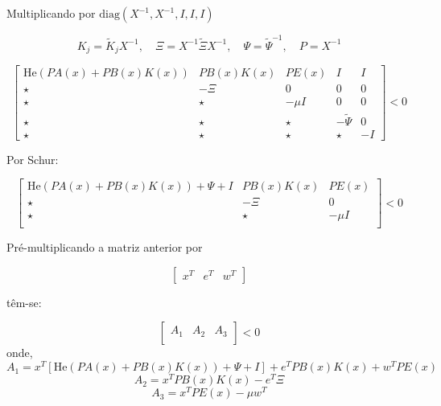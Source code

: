 Multiplicando por $\text{diag}(X^{-1}, X^{-1}, I, I, I)$

\begin{equation}
  K_j = \tilde K_j X^{-1}, \quad \Xi = X^{-1} \tilde \Xi X^{-1}, \quad \Psi = \tilde \Psi^{-1}, \quad P = X^{-1}
\end{equation}

\begin{equation}
  \begin{bmatrix}
    \text{He}(PA(x) + PB(x)K(x)) & PB(x)K(x) & P E(x) & I             & I   \\
    \star                        & -\Xi      & 0      & 0             & 0   \\
    \star                        & \star     & -\mu I & 0             & 0   \\
    \star                        & \star     & \star  & - \tilde \Psi & 0   \\
    \star                        & \star     & \star  & \star         & - I
  \end{bmatrix} < 0
\end{equation}

Por Schur:


\begin{equation}
  \begin{bmatrix}
    \text{He}(PA(x) + PB(x)K(x)) + \Psi  + I & PB(x)K(x) & P E(x) \\
    \star                                    & -\Xi      & 0      \\
    \star                                    & \star     & -\mu I \\
  \end{bmatrix} < 0
\end{equation}

Pré-multiplicando a matriz anterior por

\begin{equation}
  \begin{bmatrix}
    x^T & e^T & w^T
  \end{bmatrix}
\end{equation}

têm-se:


\begin{equation}
  \begin{bmatrix}
    A_1 & A_2 & A_3 \\
  \end{bmatrix} < 0
\end{equation}
onde,
\begin{equation}
  A_1 = x^T \left[\text{He}(PA(x) + PB(x)K(x)) + \Psi  + I\right] + e^TPB(x)K(x) + w^TPE(x)
\end{equation}
\begin{equation}
  A_2 = x^TPB(x)K(x) - e^T\Xi
\end{equation}
\begin{equation}
  A_3 = x^TPE(x) - \mu w^T
\end{equation}

